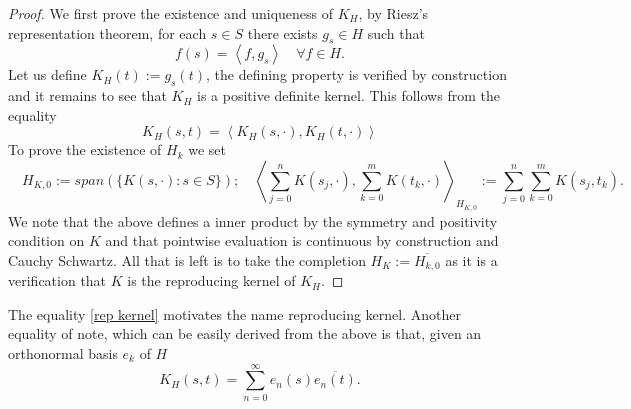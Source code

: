 \documentclass[12pt]{article}
\newcommand{\br}[1]{\left\langle#1\right\rangle}
\begin{document}
\begin{proof}
	We first prove the existence and uniqueness of $K_H$, by Riesz's representation theorem, for each $s\in S$ there exists $g_s\in H$ such that
	\begin{equation*}
		f(s)=\br{f,g_s}\quad\forall f\in H.
	\end{equation*}
	Let us define $K_H(t):=g_s(t)$, the defining property is verified by construction and it remains to see that $K_H$ is a positive definite
	kernel. This follows from the equality
	\begin{equation}\label{rep kernel}
		K_H(s,t)=\br{K_H(s,\cdot ),K_H(t,\cdot )}
	\end{equation}
	To prove the existence of $H_k$ we set
	\begin{equation*}
		\quad H_{K,0}:=span(\{K(s,\cdot ):s\in S\});\quad \br{\sum_{j=0}^{n}K(s_j,\cdot ),\sum_{k=0}^{m} K(t_k,\cdot )}_{H_{K,0}}:=\sum_{j=0}^{n}\sum_{k=0}^{m}K(s_j,t_k).
	\end{equation*}
	We note that the above defines a inner product by the symmetry and positivity condition on $K$ and that pointwise evaluation is continuous by construction and Cauchy Schwartz. All that is left is to take the completion  $H_K:=\overline{H_{k,0}}$ as it is a verification that $K$ is the reproducing kernel of  $K_H$.
\end{proof}
The equality \eqref{rep kernel} motivates the name reproducing kernel. Another equality of note, which can be easily derived from the above is that, given an orthonormal basis $e_k$ of $H$
\begin{equation*}
	K_H(s,t)=\sum_{n=0}^{\infty} e_n(s)\overline{e_n(t)}.
\end{equation*}
\end{document}
